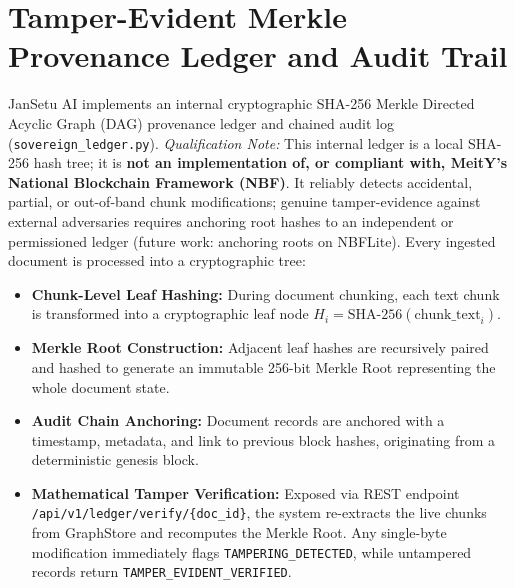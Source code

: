 \documentclass[12pt,a4paper,oneside]{report}
\begin{document}
\section{Tamper-Evident Merkle Provenance Ledger and Audit Trail}
JanSetu AI implements an internal cryptographic SHA-256 Merkle Directed Acyclic Graph (DAG) provenance ledger and chained audit log (\texttt{sovereign\_ledger.py}). \textit{Qualification Note:} This internal ledger is a local SHA-256 hash tree; it is \textbf{not an implementation of, or compliant with, MeitY's National Blockchain Framework (NBF)}. It reliably detects accidental, partial, or out-of-band chunk modifications; genuine tamper-evidence against external adversaries requires anchoring root hashes to an independent or permissioned ledger (future work: anchoring roots on NBFLite). Every ingested document is processed into a cryptographic tree:
\begin{itemize}[itemsep=2pt]
    \item \textbf{Chunk-Level Leaf Hashing:} During document chunking, each text chunk is transformed into a cryptographic leaf node $H_i = \text{SHA-256}(\text{chunk\_text}_i)$.
    \item \textbf{Merkle Root Construction:} Adjacent leaf hashes are recursively paired and hashed to generate an immutable 256-bit Merkle Root representing the whole document state.
    \item \textbf{Audit Chain Anchoring:} Document records are anchored with a timestamp, metadata, and link to previous block hashes, originating from a deterministic genesis block.
    \item \textbf{Mathematical Tamper Verification:} Exposed via REST endpoint \texttt{/api/v1/ledger/verify/\{doc\_id\}}, the system re-extracts the live chunks from GraphStore and recomputes the Merkle Root. Any single-byte modification immediately flags \texttt{TAMPERING\_DETECTED}, while untampered records return \texttt{TAMPER\_EVIDENT\_VERIFIED}.
\end{itemize}
\end{document}
